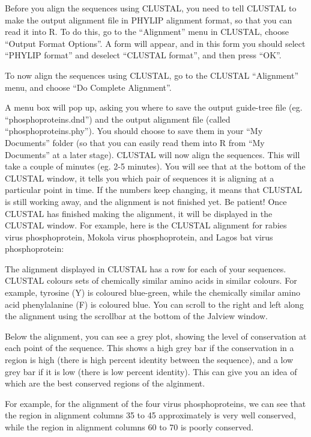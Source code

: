 \documentclass[
]{book}
\begin{document}
Before you align the sequences using CLUSTAL, you need to tell CLUSTAL to make the output alignment file in PHYLIP alignment format, so that you can read it into R. To do this, go to the ``Alignment'' menu in CLUSTAL, choose ``Output Format Options''. A form will appear, and in this form you should select ``PHYLIP format'' and deselect ``CLUSTAL format'', and then press ``OK''.

To now align the sequences using CLUSTAL, go to the CLUSTAL ``Alignment'' menu, and choose ``Do Complete Alignment''.

A menu box will pop up, asking you where to save the output guide-tree file (eg. ``phosphoproteins.dnd'') and the output alignment file (called ``phosphoproteins.phy''). You should choose to save them in your ``My Documents'' folder (so that you can easily read them into R from ``My Documents'' at a later stage).
CLUSTAL will now align the sequences. This will take a couple of minutes (eg. 2-5 minutes). You will see that at the bottom of the CLUSTAL window, it tells you which pair of sequences it is aligning at a particular point in time. If the numbers keep changing, it means that CLUSTAL is still working away, and the alignment is not finished yet. Be patient!
Once CLUSTAL has finished making the alignment, it will be displayed in the CLUSTAL window. For example, here is the CLUSTAL alignment for rabies virus phosphoprotein, Mokola virus phosphoprotein, and Lagos bat virus phosphoprotein:

The alignment displayed in CLUSTAL has a row for each of your sequences. CLUSTAL colours sets of chemically similar amino acids in similar colours. For example, tyrosine (Y) is coloured blue-green, while the chemically similar amino acid phenylalanine (F) is coloured blue. You can scroll to the right and left along the alignment using the scrollbar at the bottom of the Jalview window.

Below the alignment, you can see a grey plot, showing the level of conservation at each point of the sequence. This shows a high grey bar if the conservation in a region is high (there is high percent identity between the sequence), and a low grey bar if it is low (there is low percent identity). This can give you an idea of which are the best conserved regions of the alginment.

For example, for the alignment of the four virus phosphoproteins, we can see that the region in alignment columns 35 to 45 approximately is very well conserved, while the region in alignment columns 60 to 70 is poorly conserved.
\end{document}
